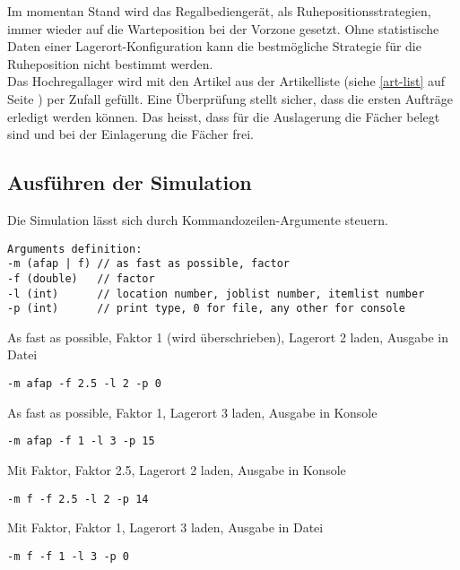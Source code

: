 %
Im momentan Stand wird das Regalbediengerät, als Ruhepositionsstrategien, immer wieder auf die Warteposition bei der Vorzone gesetzt. Ohne statistische Daten einer Lagerort-Konfiguration kann die bestmögliche Strategie für die Ruheposition nicht bestimmt werden.\\
%
Das Hochregallager wird mit den Artikel aus der Artikelliste (siehe \ref{art-list} auf Seite \pageref{art-list}) per Zufall gefüllt. Eine Überprüfung stellt sicher, dass die ersten Aufträge erledigt werden können. Das heisst, dass für die Auslagerung die Fächer belegt sind und bei der Einlagerung die Fächer frei.
%
\subsection{Ausführen der Simulation}
Die Simulation lässt sich durch Kommandozeilen-Argumente steuern. 

\begin{verbatim}
Arguments definition:
-m (afap | f) // as fast as possible, factor
-f (double)   // factor 
-l (int)      // location number, joblist number, itemlist number
-p (int)      // print type, 0 for file, any other for console 
\end{verbatim}

As fast as possible, Faktor 1 (wird überschrieben), Lagerort 2 laden, Ausgabe in Datei
\begin{verbatim}
-m afap -f 2.5 -l 2 -p 0
\end{verbatim}
As fast as possible, Faktor 1, Lagerort 3 laden, Ausgabe in Konsole
\begin{verbatim}
-m afap -f 1 -l 3 -p 15
\end{verbatim}
Mit Faktor, Faktor 2.5, Lagerort 2 laden, Ausgabe in Konsole
\begin{verbatim}
-m f -f 2.5 -l 2 -p 14
\end{verbatim}
Mit Faktor, Faktor 1, Lagerort 3 laden, Ausgabe in Datei
\begin{verbatim}
-m f -f 1 -l 3 -p 0			  
\end{verbatim}
%
